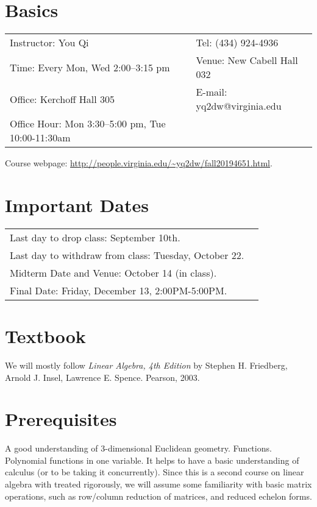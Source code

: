 \documentclass[margin,line]{res}
\begin{document}

\begin{resume}

\section{\sc Basics}
\vspace{.05in}
\begin{tabular}{@{}p{3.4in}p{4in}}
 Instructor: You Qi            & Tel: (434) 924-4936   \\
Time: Every Mon, Wed 2:00--3:15 pm & Venue: New Cabell Hall 032\\
Office: Kerchoff Hall 305   & E-mail: yq2dw@virginia.edu \\
Office Hour: Mon 3:30--5:00 pm, Tue 10:00-11:30am &\\
\end{tabular}
Course webpage: \url{http://people.virginia.edu/~yq2dw/fall20194651.html}.

\section{\sc Important Dates}
\begin{tabular}{@{}p{3.4in}p{4in}}
Last day to drop class: September 10th. & \\
Last day to withdraw from class: Tuesday, October 22. &\\
Midterm Date and Venue: October 14 (in class). &\\
Final Date: Friday, December 13, 2:00PM-5:00PM. &
\end{tabular}


\section{\sc Textbook}
We will mostly follow \emph{Linear Algebra, 4th Edition}
by Stephen H. Friedberg, Arnold J. Insel, Lawrence E. Spence. Pearson, 2003.

\section{\sc Prerequisites}
A good understanding of 3-dimensional Euclidean geometry. Functions. Polynomial functions in one variable. It helps to have a basic understanding of calculus (or to be taking it concurrently). Since this is a second course on linear algebra with treated rigorously, we will assume some familiarity with basic matrix operations, such as row/column reduction of matrices, and reduced echelon forms.



\end{resume}
\end{document}

